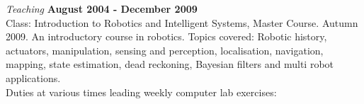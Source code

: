 \documentclass[a4paper,margin,line]{res} \usepackage{latexsym}
\newenvironment{list2}{
  \begin{list}{$\bullet$}{%
      \setlength{\itemsep}{0in} \setlength{\parsep}{0in}
      \setlength{\parskip}{0in} \setlength{\topsep}{0in}
      \setlength{\partopsep}{0in}
      \setlength{\leftmargin}{0.2in}}}{\end{list}}
\begin{document}
\begin{resume}










{\em Teaching} \hfill {\bf August 2004 - December
  2009}\\ Class: Introduction to Robotics and Intelligent Systems, Master
Course. Autumn 2009. An introductory course in robotics. Topics
covered: Robotic history, actuators, manipulation, sensing and
perception, localisation, navigation, mapping, state estimation, dead
reckoning, Bayesian filters and multi robot applications.
\\ Duties at various times leading weekly computer lab exercises:


\end{resume}
\end{document}
